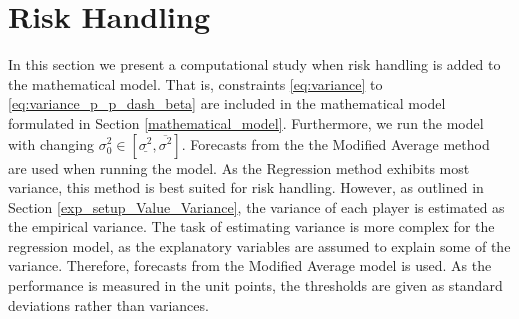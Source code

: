 \section{Risk Handling}

In this section we present a computational study when risk handling is added to the mathematical model. That is, constraints \ref{eq:variance} to \ref{eq:variance_p_p_dash_beta} are included in the mathematical model formulated in Section \ref{mathematical_model}. Furthermore, we run the model with changing $\sigma_{0}^2 \in [\underline{\sigma^2}, \overline{\sigma^2}]$. Forecasts from the the Modified Average method are used when running the model. As the Regression method exhibits most variance, this method is best suited for risk handling. However, as outlined in Section \ref{exp_setup_Value_Variance}, the variance of each player is estimated as the empirical variance. The task of estimating variance is more complex for the regression model, as the explanatory variables are assumed to explain some of the variance. Therefore, forecasts from the Modified Average model is used. As the performance is measured in the unit points, the thresholds are given as standard deviations rather than variances. 

\newpar

\newpar

